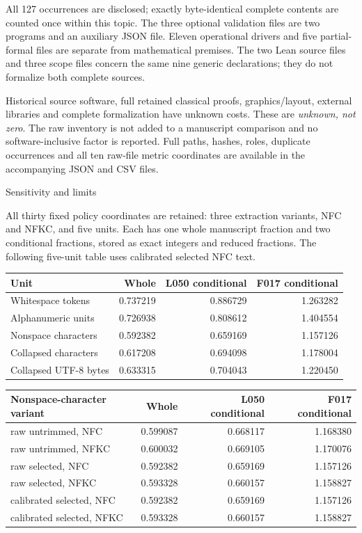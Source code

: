 \documentclass[10pt,a4paper]{article}
\begin{document}
All 127 occurrences are disclosed; exactly byte-identical complete contents are
counted once within this topic. The three optional validation files are two
programs and an auxiliary JSON file. Eleven operational drivers and five
partial-formal files are separate from mathematical premises. The two Lean
source files and three scope files concern the same nine generic declarations;
they do not formalize both complete sources.

Historical source software, full retained classical proofs, graphics/layout,
external libraries and complete formalization have unknown costs. These are
\emph{unknown, not zero}. The raw inventory is not added to a manuscript
comparison and no software-inclusive factor is reported. Full paths, hashes,
roles, duplicate occurrences and all ten raw-file metric coordinates are
available in the accompanying JSON and CSV files.

\newpage
\begin{center}{\Large Sensitivity and limits}\end{center}

All thirty fixed policy coordinates are retained: three extraction variants,
NFC and NFKC, and five units. Each has one whole manuscript fraction and two
conditional fractions, stored as exact integers and reduced fractions. The
following five-unit table uses calibrated selected NFC text.

\begin{center}\small
\begin{tabular}{lrrr}\toprule
Unit & Whole & L050 conditional & F017 conditional\\\midrule
Whitespace tokens & 0.737219 & 0.886729 & 1.263282 \\
Alphanumeric units & 0.726938 & 0.808612 & 1.404554 \\
Nonspace characters & 0.592382 & 0.659169 & 1.157126 \\
Collapsed characters & 0.617208 & 0.694098 & 1.178004 \\
Collapsed UTF-8 bytes & 0.633315 & 0.704043 & 1.220450 \\
\bottomrule\end{tabular}\end{center}

\begin{center}\small
\begin{tabular}{lrrr}\toprule
Nonspace-character variant & Whole & L050 conditional & F017 conditional\\\midrule
raw untrimmed, NFC & 0.599087 & 0.668117 & 1.168380 \\
raw untrimmed, NFKC & 0.600032 & 0.669105 & 1.170076 \\
raw selected, NFC & 0.592382 & 0.659169 & 1.157126 \\
raw selected, NFKC & 0.593328 & 0.660157 & 1.158827 \\
calibrated selected, NFC & 0.592382 & 0.659169 & 1.157126 \\
calibrated selected, NFKC & 0.593328 & 0.660157 & 1.158827 \\
\bottomrule\end{tabular}\end{center}
\end{document}

